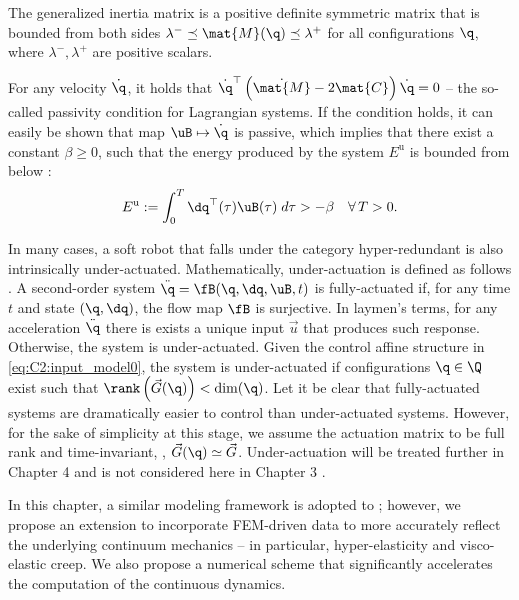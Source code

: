 \begin{asm}
The generalized inertia matrix is a positive definite symmetric matrix that is bounded from both sides $\lambda^{-} \preceq \mat{M}(\q) \preceq \lambda^{+}$ for all configurations $\q$, where $\lambda^{-},\lambda^{+}$ are positive scalars.
\end{asm}

\begin{asm}[Passivity]
For any velocity $\dot{\q}$, it holds that $\dot{\q}^\top\left(\dot{\mat{M}} - 2\mat{C}  \right)\dot{\q} = 0$ -- the so-called passivity condition for Lagrangian systems. If the condition holds, it can easily be shown that map $\uB \mapsto \dot{\q}$ is passive, which implies that there exist a constant $\beta \ge 0$, such that the energy produced by the system $E^{\textrm{u}}$ is bounded from below \cite{Ortega1998}:
%
\begin{equation}
E^{\textrm{u}} := \int_0^T \dq^\top(\tau) \uB(\tau) \;d\tau > -\beta \quad \forall\,T > 0.
\label{as:C2:passivity}
\end{equation}
%
\end{asm}

\begin{asm}
In many cases, a soft robot that falls under the category hyper-redundant is also intrinsically under-actuated. Mathematically, under-actuation is defined as follows \cite{Russ2022}. A second-order system $\ddot{\q} = \fB(\q,\dq,\uB,t)$ is fully-actuated if, for any time $t$ and state $(\q,\dq)$, the flow map $\fB$ is surjective. In laymen's terms, for any acceleration $\ddot{\q}$ there is exists a unique input $\vec{u}$ that produces such response. Otherwise, the system is under-actuated. Given the control affine structure in \eqref{eq:C2:input_model0}, the system is under-actuated if configurations $\q \in \Q$ exist such that $\rank \left( \vec{G}(\q) \right) < \dim(\q)$. Let it be clear that fully-actuated systems are dramatically easier to control than under-actuated systems. However, for the sake of simplicity at this stage, we assume the actuation matrix to be full rank and time-invariant, \ie, $\vec{G}(\q) \simeq \vec{G}$. Under-actuation will be treated further in Chapter 4 and  is not considered here in Chapter 3 .
\end{asm}

In this chapter, a similar modeling framework is adopted to \cite{Mochiyama2003}; however, we propose an extension to incorporate FEM-driven data to more accurately reflect the underlying continuum mechanics -- in particular, hyper-elasticity and visco-elastic creep. We also propose a numerical scheme that significantly accelerates the computation of the continuous dynamics.

